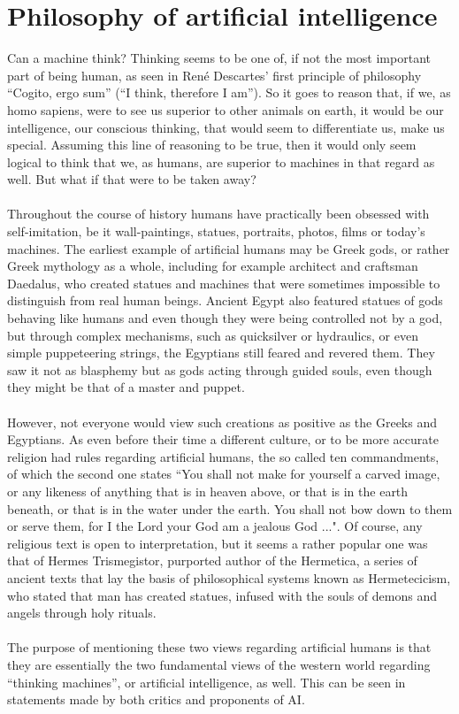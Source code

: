 \section{Philosophy of artificial intelligence}
Can a machine think? Thinking seems to be one of, if not the most important part of being human, as seen in René Descartes' first principle of philosophy “Cogito, ergo sum” (“I think, therefore I am”). So it goes to reason that, if we, as homo sapiens, were to see us superior to other animals on earth, it would be our intelligence, our conscious thinking, that would seem to differentiate us, make us special. Assuming this line of reasoning to be true, then it would only seem logical to think that we, as humans, are superior to machines in that regard as well. But what if that were to be taken away?
\\
\\
Throughout the course of history humans have practically been obsessed with self-imitation, be it wall-paintings, statues, portraits, photos, films or today's machines. The earliest example of artificial humans may be Greek gods, or rather Greek mythology as a whole, including for example architect and craftsman Daedalus, who created statues and machines that were sometimes impossible to distinguish from real human beings. Ancient Egypt also featured statues of gods behaving like humans and even though they were being controlled not by a god, but through complex mechanisms, such as quicksilver or hydraulics, or even simple puppeteering strings, the Egyptians still feared and revered them. They saw it not as blasphemy but as gods acting through guided souls, even though they might be that of a master and puppet.
\\
\\
However, not everyone would view such creations as positive as the Greeks and Egyptians. As even before their time a different culture, or to be more accurate religion had rules regarding artificial humans, the so called ten commandments, of which the second one states “You shall not make for yourself a carved image, or any likeness of anything that is in heaven above, or that is in the earth beneath, or that is in the water under the earth. You shall not bow down to them or serve them, for I the Lord your God am a jealous God ...". Of course, any religious text is open to interpretation, but it seems a rather popular one was that of Hermes Trismegistor, purported author of the Hermetica, a series of ancient texts that lay the basis of philosophical systems known as Hermetecicism, who stated that man has created statues, infused with the souls of demons and angels through holy rituals.
\\
\\
The purpose of mentioning these two views regarding artificial humans is that they are essentially the two fundamental views of the western world regarding “thinking machines”, or artificial intelligence, as well. This can be seen in statements made by both critics and proponents of AI. 
\cite{Denkmachinen}
\newpage

